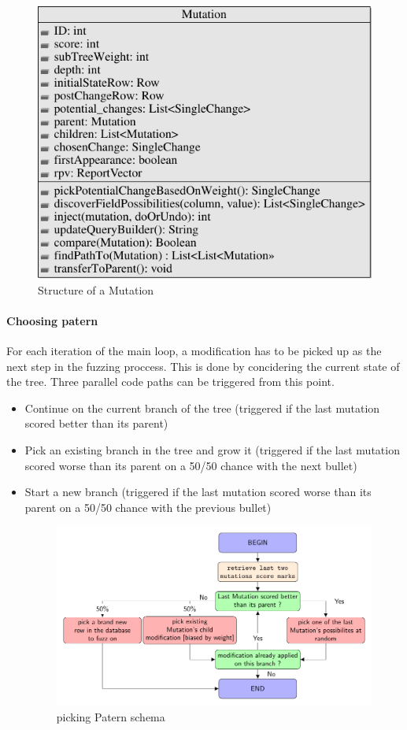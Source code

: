 \documentclass{article}
\begin{document}
\begin{empfile}
\begin{figure} 
\centering
\includegraphics[scale=1]{MutationClassDiagram-1.pdf}
\caption{Structure of a Mutation}
\end{figure}

  				
				\paragraph{Choosing patern}
For each iteration of the main loop, a modification has to be picked up as the next step in the fuzzing proccess. This is done by concidering the current state of the tree.
Three parallel code paths can be triggered from this point.
				\begin{itemize}
				\item{Continue on the current branch of the tree (triggered if the last mutation scored better than its parent)}
				\item{Pick an existing branch in the tree and grow it (triggered if the last mutation scored worse than its parent on a 50/50 chance with the next bullet)}
				\item{Start a new branch (triggered if the last mutation scored worse than its parent on a 50/50 chance with the previous bullet)}
				
\begin{figure} 
\centering
\includegraphics[scale=1]{pickingPaternDiagram.pdf}
\caption{picking Patern schema}
\end{figure}				
				

\end{itemize}
\end{empfile}
\end{document}

